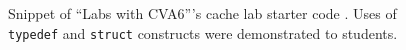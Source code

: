 
\begin{figure}[t]
    \centering
    \inputminted[frame=single]{systemverilog}{media/code/cache_lab/cache.svh}
    \caption[
        C-like constructs in ``Labs with CVA6''
    ]{
        Snippet of ``Labs with CVA6'''s cache lab starter code \cite{labsWithCVA6}. Uses of \texttt{typedef} and \texttt{struct} constructs were demonstrated to students.
    }
    \label{fig:cache_lab}
\end{figure}
